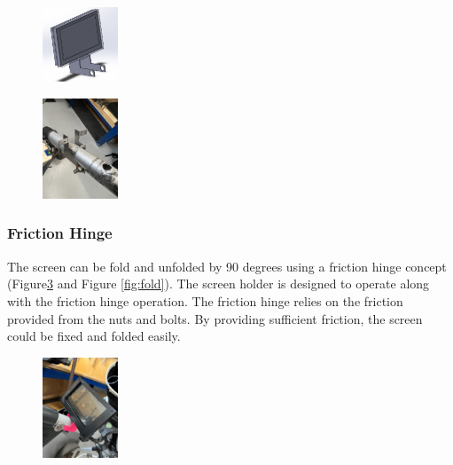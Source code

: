 \documentclass[11pt,landscape]{article}
\begin{document}
\begin{multicols}{3}
    \begin{figure}[H]
        \begin{center}
            \includegraphics[width=0.2\textwidth]{Figure14.jpg}
            \label{fig:holder}
        \end{center}
    \end{figure}
    
    \begin{figure}[H]
        \begin{center}
            \includegraphics[width=0.2\textwidth]{Figure31.jpg}
            \label{fig:rod}
        \end{center}
    \end{figure}
    
    
    
    \subsubsection{Friction Hinge}
    The screen can be fold and unfolded by 90 degrees using a friction hinge
    concept (Figure\ref{fig:unfold} and Figure \ref{fig:fold}). The screen
    holder is designed to operate along with the friction hinge operation. The
    friction hinge relies on the friction provided from the nuts and bolts. By
    providing sufficient friction, the screen could be fixed and folded easily.
    
    \begin{figure}[H]
        \begin{center}
            \includegraphics[width=0.2\textwidth]{Figure17.jpg}
            \label{fig:unfold}
        \end{center}
    \end{figure}
    

\end{multicols}
\end{document}
